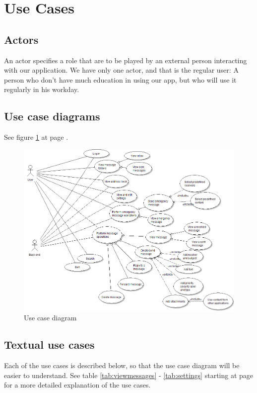 \section{Use Cases}

\subsection{Actors}
An actor specifies a role that are to be played by an external person interacting with our application. We have only one actor, and that is the regular user:  A person who don’t have much education in using our app, but who will use it regularly in his workday.

\subsection{Use case diagrams}
See figure \ref{fig:usecase} at page \pageref{fig:usecase}.

\begin{figure}
\begin{center}
\includegraphics[width=\textwidth]{kpro-use-case}
\caption{Use case diagram} \label{fig:usecase}
\end{center}
\end{figure}

\subsection{Textual use cases}
Each of the use cases is described below, so that the use case diagram will be easier to understand. See table \ref{tab:viewmessages} - \ref{tab:settings} starting at page \pageref{tab:viewmessages} for a more detailed explanation of the use cases.


